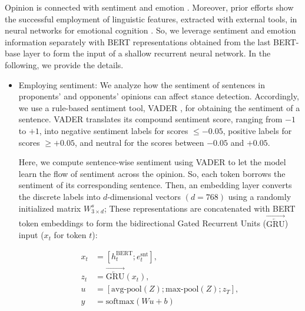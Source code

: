 \documentclass[11pt,a4paper]{article}
\begin{document}
Opinion is connected with sentiment and emotion \cite{SchneiderD15}. Moreover, prior efforts show the successful employment of linguistic features, extracted with external tools, in neural networks for emotional cognition \cite{yang-etal-2017-satirical}. So, we leverage sentiment and emotion information separately with BERT representations obtained from the last BERT-base layer to form the input of a shallow recurrent neural network. In the following, we provide the details.

\begin{itemize}
    \item Employing sentiment:
We analyze how the sentiment of sentences in proponents' and opponents' opinions can affect stance detection. Accordingly, we use a rule-based sentiment tool,  VADER \cite{Hutto2014VADERAP},  for obtaining the sentiment of a sentence. VADER
translates its compound sentiment score,  ranging from $-1$ to $+1$, into negative sentiment labels for scores $\leqslant -0.05$, positive labels for scores $\geqslant +0.05$, and neutral for the scores between $-0.05$ and $+0.05$.



Here, we compute sentence-wise sentiment using VADER to let the model learn the flow of sentiment across the opinion. So, each token borrows the sentiment of its corresponding sentence. Then, an embedding layer converts the discrete labels into  $d$-dimensional vectors $(d=768)$  using a randomly initialized matrix $W^s_{3\times d}$; These representations are concatenated with BERT token embeddings to form the bidirectional Gated Recurrent Units ($\overrightarrow{\overleftarrow{\text{GRU}}}$)  input ($x_t$ for token $t$):
    
    \begin{equation*}
    \begin{aligned}
        x_t  &=  [h_{t}^{\text{BERT}};e_t^{\text{snt}}],\\
        z_{t}  &=  \overrightarrow{\overleftarrow{\text{GRU}}}(x_t),\\
        u   &=  [\text{avg-pool}(Z);\text{max-pool}(Z);z_T],\\
        y  &=   \text{softmax}(Wu+b)  
    \end{aligned}
    \end{equation*}
    

\end{itemize}
\end{document}
